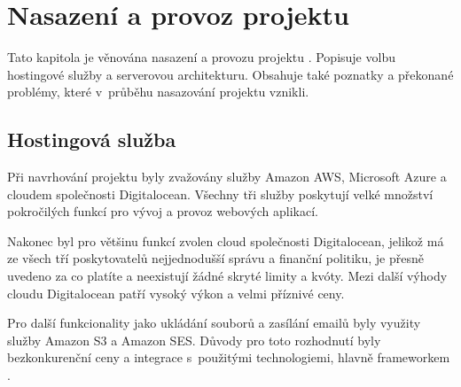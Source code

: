 \section{Nasazení a provoz projektu}\label{sec:deployment-running}

Tato kapitola je věnována nasazení a provozu projektu \bso{}.
Popisuje volbu hostingové služby a serverovou architekturu.
Obsahuje také poznatky a překonané problémy, které v~průběhu nasazování projektu vznikli.

\subsection{Hostingová služba}
\label{sub:hosting}

Při navrhování projektu \bso{} byly zvažovány služby Amazon AWS\cite{amazon-aws}, Microsoft Azure\cite{ms-azure} a cloudem společnosti Digitalocean\cite{digitalocean}.
Všechny tři služby poskytují velké množství pokročilých funkcí pro vývoj a provoz webových aplikací. 

Nakonec byl pro většinu funkcí zvolen cloud společnosti Digitalocean, jelikož má ze všech tří poskytovatelů nejjednodušší správu a finanční politiku,
je přesně uvedeno za co platíte a neexistují žádné skryté limity a kvóty.
Mezi další výhody cloudu Digitalocean patří vysoký výkon a velmi příznivé ceny.\cite{digitalocean-advantages}

Pro další funkcionality jako ukládání souborů a zasílání emailů byly využity služby Amazon S3\cite{amazon-s3} a Amazon SES\cite{amazon-ses}.
Důvody pro toto rozhodnutí byly bezkonkurenční ceny a integrace s~použitými technologiemi, hlavně \gls{framework}em .


